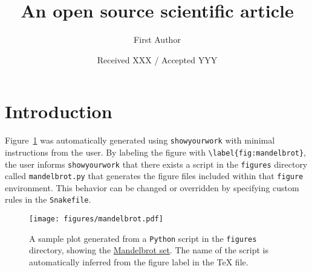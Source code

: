 \documentclass[hidelinks]{aa}
\begin{document}
\title{An open source scientific article}

\author{First Author}


\date{Received XXX / Accepted YYY}

\abstract{
    \blindtext
}

\maketitle

\section{Introduction}

Figure~\ref{fig:mandelbrot} was automatically generated using \texttt{showyourwork} with minimal instructions from the user.
By labeling the figure with \verb+\label{fig:mandelbrot}+, the user informs \texttt{showyourwork} that there exists a script in the \texttt{figures} directory called \texttt{mandelbrot.py} that generates the figure files included within that \texttt{figure} environment.
This behavior can be changed or overridden by specifying custom rules in the \texttt{Snakefile}.

\begin{figure}
    \begin{centering}
        \texttt{[image: figures/mandelbrot.pdf]}
        \caption{
            A sample plot generated from a \texttt{Python} script in the \texttt{figures} directory, showing the \href{https://en.wikipedia.org/wiki/Mandelbrot_set}{Mandelbrot set}.
            The name of the script is automatically inferred from the figure label in the TeX file.
        }
        \label{fig:mandelbrot}
    \end{centering}
\end{figure}
\end{document}

